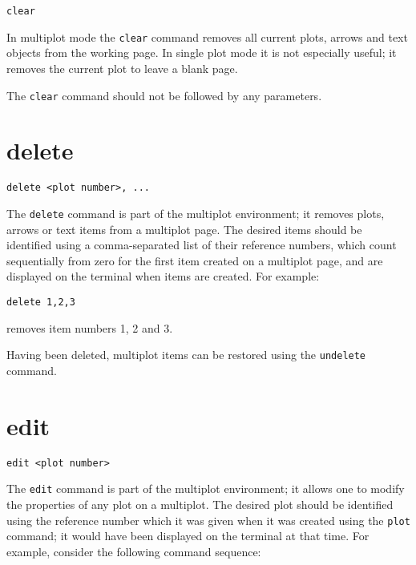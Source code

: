 \documentclass[a4paper,onecolumn,11pt]{book}
\begin{document}
\begin{verbatim}
clear
\end{verbatim}

In multiplot mode the {\tt clear} command removes all current plots, arrows and
text objects from the working page. In single plot mode it is not especially
useful; it removes the current plot to leave a blank page.

The {\tt clear} command should not be followed by any parameters.


\section{delete}

\begin{verbatim}
delete <plot number>, ...
\end{verbatim}

The {\tt delete} command is part of the multiplot environment; it removes
plots, arrows or text items from a multiplot page. The desired items should be
identified using a comma-separated list of their reference numbers, which count
sequentially from zero for the first item created on a multiplot page, and are
displayed on the terminal when items are created.  For example:

\begin{verbatim}
delete 1,2,3
\end{verbatim}

\noindent removes item numbers 1, 2 and 3.

Having been deleted, multiplot items can be restored using the {\tt undelete}
command.

\section{edit}

\begin{verbatim}
edit <plot number>
\end{verbatim}

The {\tt edit} command is part of the multiplot environment; it allows one to
modify the properties of any plot on a multiplot. The desired plot should be
identified using the reference number which it was given when it was created
using the {\tt plot} command; it would have been displayed on the terminal at
that time. For example, consider the following command sequence:
\end{document}
